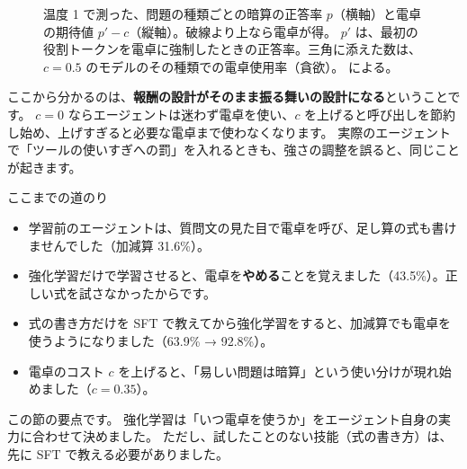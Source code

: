 \begin{figure}[tbp]
\begin{minipage}[t]{0.48\linewidth}
\caption{温度 1 で測った、問題の種類ごとの暗算の正答率 $p$（横軸）と電卓の期待値 $p'-c$（縦軸）。破線より上なら電卓が得。
$p'$ は、最初の役割トークンを電卓に強制したときの正答率。三角に添えた数は、$c=0.5$ のモデルのその種類での電卓使用率（貪欲）。 による。}
\label{fig:arl-threshold}
\end{minipage}
\end{figure}

ここから分かるのは、\textbf{報酬の設計がそのまま振る舞いの設計になる}ということです。
$c=0$ ならエージェントは迷わず電卓を使い、$c$ を上げると呼び出しを節約し始め、上げすぎると必要な電卓まで使わなくなります。
実際のエージェントで「ツールの使いすぎへの罰」を入れるときも、強さの調整を誤ると、同じことが起きます。

\begin{intuition}{ここまでの道のり}
\begin{itemize}
\item 学習前のエージェントは、質問文の見た目で電卓を呼び、足し算の式も書けませんでした（加減算 31.6\%）。
\item 強化学習だけで学習させると、電卓を\textbf{やめる}ことを覚えました（43.5\%）。正しい式を試さなかったからです。
\item 式の書き方だけを SFT で教えてから強化学習をすると、加減算でも電卓を使うようになりました（63.9\% → 92.8\%）。
\item 電卓のコスト $c$ を上げると、「易しい問題は暗算」という使い分けが現れ始めました（$c=0.35$）。
\end{itemize}
\end{intuition}

この節の要点です。
強化学習は「いつ電卓を使うか」をエージェント自身の実力に合わせて決めました。
ただし、試したことのない技能（式の書き方）は、先に SFT で教える必要がありました。

